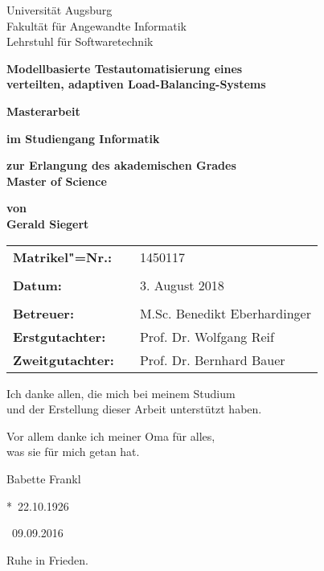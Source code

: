 \begin{center}
    {\Large{Universität Augsburg\\
            Fakultät für Angewandte Informatik\\
            Lehrstuhl für Softwaretechnik}}
    \vspace{3\baselineskip}
    
    \begin{onehalfspace}
        \textbf{\large{Modellbasierte Testautomatisierung eines\\verteilten, adaptiven Load-Balancing-Systems}}
    \end{onehalfspace}
    \vspace{3\baselineskip}
    
    \textbf{{\Large{Masterarbeit}}}
    \vspace{1\baselineskip}
    
    \textbf{im Studiengang Informatik}
    \vspace{1\baselineskip}
    
    \textbf{zur Erlangung des akademischen Grades\\Master of Science}
    \vspace{1\baselineskip}
    
    \textbf{von\\Gerald Siegert}
    \vfill
    
    \begin{singlespace}
        \begin{tabular}{lll}
        	\textbf{Matrikel"=Nr.:}  &  & 1450117                      \\
        	                         &  &                              \\
        	\textbf{Datum:}          &  & 3. August 2018               \\
        	                         &  &                              \\
        	\textbf{Betreuer:}       &  & M.Sc. Benedikt Eberhardinger \\
        	\textbf{Erstgutachter:}  &  & Prof. Dr. Wolfgang Reif      \\
        	\textbf{Zweitgutachter:} &  & Prof. Dr. Bernhard Bauer
        \end{tabular}
    \end{singlespace}
    
    \clearpage
    \thispagestyle{plain}
    
    Ich danke allen, die mich bei meinem Studium\\
    und der Erstellung dieser Arbeit unterstützt haben.
    \vspace{3\baselineskip}
    
    Vor allem danke ich meiner Oma für alles,\\
    was sie für mich getan hat.
    \vspace{1\baselineskip}
    
    Babette Frankl
    
    \begin{singlespace}
    *~22.10.1926
    
    \textdagger~09.09.2016
    \end{singlespace}
    
    Ruhe in Frieden.
    \vspace*{\fill}
\end{center}
